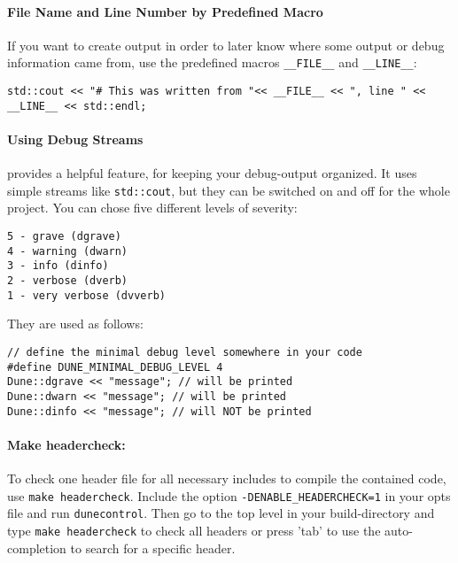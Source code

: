 
\paragraph{File Name and Line Number by Predefined Macro}
If you want to create output in order to later know where some output or debug information came from, use the predefined
macros \texttt{\_\_FILE\_\_} and \texttt{\_\_LINE\_\_}:
\begin{lstlisting}[style=DumuxCode]
std::cout << "# This was written from "<< __FILE__ << ", line " << __LINE__ << std::endl;
\end{lstlisting}

\paragraph{Using \Dune Debug Streams}
\Dune provides a helpful feature, for keeping your debug-output organized.
It uses simple streams like \texttt{std::cout}, but they can be switched on and off
for the whole project. You can chose five different levels of severity:
\begin{verbatim}
5 - grave (dgrave)
4 - warning (dwarn)
3 - info (dinfo)
2 - verbose (dverb)
1 - very verbose (dvverb)
\end{verbatim}
\noindent They are used as follows:
\begin{lstlisting}[style=DumuxCode]
// define the minimal debug level somewhere in your code
#define DUNE_MINIMAL_DEBUG_LEVEL 4
Dune::dgrave << "message"; // will be printed
Dune::dwarn << "message"; // will be printed
Dune::dinfo << "message"; // will NOT be printed
\end{lstlisting}

\paragraph{Make headercheck:}
To check one header file for all necessary includes to compile the contained code, use \texttt{make headercheck}.
Include the option \texttt{-DENABLE\_HEADERCHECK=1} in your opts file and run \texttt{dunecontrol}.
Then go to the top level in your build-directory and type \texttt{make headercheck} to check all headers
or press 'tab' to use the auto-completion to search for a specific header.
